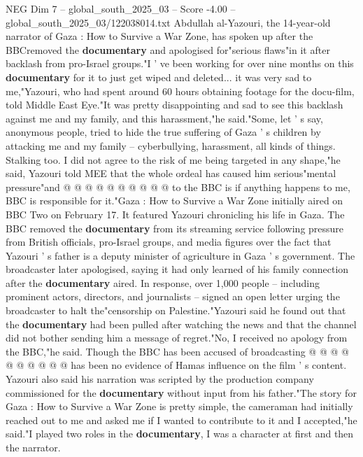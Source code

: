 \begin{textsample}{NEG Dim 7 – global\_south\_2025\_03 – Score -4.00 – global\_south\_2025\_03/122038014.txt}  \label{ex:f7_neg_358}
Abdullah al-Yazouri, the 14-year-old narrator of Gaza : How to Survive a War Zone, has spoken up after the BBCremoved the \textbf{documentary} and apologised for"serious flaws"in it after backlash from pro-Israel groups."I ' ve been working for over nine months on this \textbf{documentary} for it to just get wiped and deleted... it was very sad to me,"Yazouri, who had spent around 60 hours obtaining footage for the docu-film, told Middle East Eye."It was pretty disappointing and sad to see this backlash against me and my family, and this harassment,"he said."Some, let ' s say, anonymous people, tried to hide the true suffering of Gaza ' s children by attacking me and my family -- cyberbullying, harassment, all kinds of things.
Stalking too.
I did not agree to the risk of me being targeted in any shape,"he said, Yazouri told MEE that the whole ordeal has caused him serious"mental pressure"and @ @ @ @ @ @ @ @ @ @ to the BBC is if anything happens to me, BBC is responsible for it."Gaza : How to Survive a War Zone initially aired on BBC Two on February 17.
It featured Yazouri chronicling his life in Gaza.
The BBC removed the \textbf{documentary} from its streaming service following pressure from British officials, pro-Israel groups, and media figures over the fact that Yazouri ' s father is a deputy minister of agriculture in Gaza ' s government.
The broadcaster later apologised, saying it had only learned of his family connection after the \textbf{documentary} aired.
In response, over 1,000 people -- including prominent actors, directors, and journalists -- signed an open letter urging the broadcaster to halt the"censorship on Palestine."Yazouri said he found out that the \textbf{documentary} had been pulled after watching the news and that the channel did not bother sending him a message of regret."No, I received no apology from the BBC,"he said.
Though the BBC has been accused of broadcasting @ @ @ @ @ @ @ @ @ @ has been no evidence of Hamas influence on the film ' s content.
Yazouri also said his narration was scripted by the production company commissioned for the \textbf{documentary} without input from his father."The story for Gaza : How to Survive a War Zone is pretty simple, the cameraman had initially reached out to me and asked me if I wanted to contribute to it and I accepted,"he said."I played two roles in the \textbf{documentary}, I was a character at first and then the narrator.

\end{textsample}

